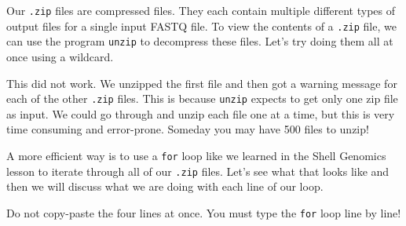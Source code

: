 \documentclass[
  letterpaper,
  DIV=11,
  numbers=noendperiod]{scrreprt}
\newenvironment{Shaded}{\begin{snugshade}}{\end{snugshade}}
\newcommand{\ExtensionTok}[1]{\textcolor[rgb]{0.00,0.23,0.31}{#1}}
\newcommand{\NormalTok}[1]{\textcolor[rgb]{0.00,0.23,0.31}{#1}}
\newcommand{\PreprocessorTok}[1]{\textcolor[rgb]{0.68,0.00,0.00}{#1}}
\begin{document}
Our \texttt{.zip} files are compressed files. They each contain multiple
different types of output files for a single input FASTQ file. To view
the contents of a \texttt{.zip} file, we can use the program
\texttt{unzip} to decompress these files. Let's try doing them all at
once using a wildcard.

\begin{Shaded}
\end{Shaded}

This did not work. We unzipped the first file and then got a warning
message for each of the other \texttt{.zip} files. This is because
\texttt{unzip} expects to get only one zip file as input. We could go
through and unzip each file one at a time, but this is very time
consuming and error-prone. Someday you may have 500 files to unzip!

A more efficient way is to use a \texttt{for} loop like we learned in
the Shell Genomics lesson to iterate through all of our \texttt{.zip}
files. Let's see what that looks like and then we will discuss what we
are doing with each line of our loop.

\begin{tcolorbox}[enhanced jigsaw, toptitle=1mm, breakable, bottomrule=.15mm, colback=white, toprule=.15mm, opacityback=0, bottomtitle=1mm, coltitle=black, opacitybacktitle=0.6, rightrule=.15mm, colframe=quarto-callout-warning-color-frame, titlerule=0mm, colbacktitle=quarto-callout-warning-color!10!white, title=\textcolor{quarto-callout-warning-color}{\faExclamationTriangle}\hspace{0.5em}{Warning}, left=2mm, leftrule=.75mm, arc=.35mm]

Do not copy-paste the four lines at once. You must type the \texttt{for}
loop line by line!

\end{tcolorbox}
\end{document}
